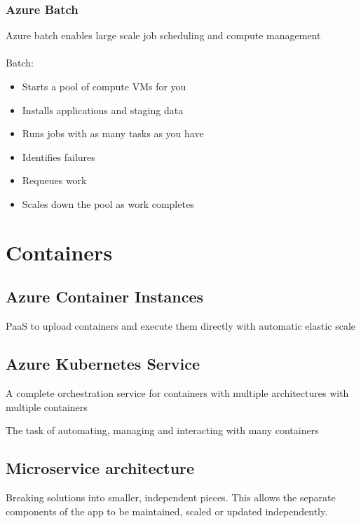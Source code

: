 \documentclass{article}[18pt]
\begin{document}
\subsubsection{Azure Batch}
Azure batch enables large scale job scheduling and compute management\\
\\
Batch:
\begin{itemize}
	\item Starts a pool of compute VMs for you
	\item Installs applications and staging data
	\item Runs jobs with as many tasks as you have
	\item Identifies failures
	\item Requeues work
	\item Scales down the pool as work completes
\end{itemize}

\section{Containers}
\subsection{Azure Container Instances}
PaaS to upload containers and execute them directly with automatic elastic scale
\subsection{Azure Kubernetes Service}
A complete orchestration service for containers with multiple architectures with multiple containers
\begin{definition}[Orchestration]
	The task of automating, managing and interacting with many containers
\end{definition}
\subsection{Microservice architecture}
Breaking solutions into smaller, independent pieces. This allows the separate components of the app to be maintained, scaled or updated independently.
\end{document}
